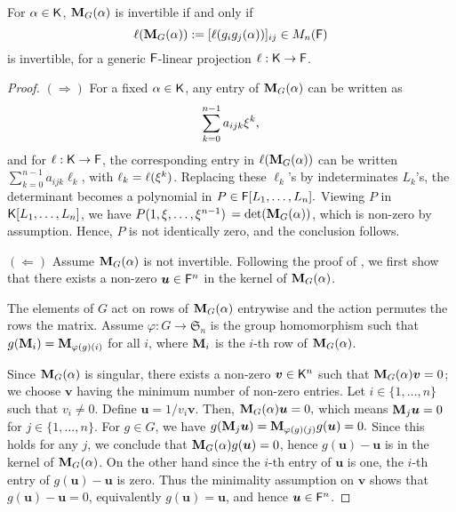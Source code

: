 \begin{lemma}
  \label{Lem:Proj}
  For $\alpha \in {\mathsf{K}}$, $\mat M_G(\alpha)$ is invertible if and only
  if $$\ell(\mat M_G(\alpha)) := [\ell(g_ig_j(\alpha))]_{ij} \in M_n(\F)$$
  is invertible, for a generic ${\mathsf{F}}$-linear projection $\ell: {\mathsf{K}} \to {\mathsf{F}}$.
\end{lemma}
\begin{proof}
  $(\Rightarrow)$ For a fixed $\alpha\in{\mathsf{K}}$, any entry of
  $\mat M_G(\alpha)$ can be written as
  \begin{equation}\label{Eq:PrimElm}
    \sum_{k= 0}^{n-1} a_{ijk}\xi^k,
  \end{equation}
  and for $\ell: {\mathsf{K}} \to {\mathsf{F}}$, the corresponding entry in $\ell(\mat
  M_G(\alpha))$ can be written $\sum_{k= 0}^{n-1} a_{ijk}\ell_k$, with
  $\ell_k = \ell(\xi^k)$. Replacing these $\ell_k$'s by
  indeterminates $L_k$'s, the determinant becomes a polynomial in $P
  \in {\mathsf{F}}[L_1, \ldots, L_n].$ Viewing $P$ in ${\mathsf{K}}[L_1, \ldots, L_n]$, we
  have $ P(1, \xi, \ldots, \xi^{n-1})$ $= \det(\mat M_G(\alpha))$,
  which is non-zero by assumption. Hence, $P$ is not identically zero,
  and the conclusion follows.
  
  $(\Leftarrow)$ Assume $\mat M_G(\alpha)$ is not invertible. Following the
  proof of \cite[Lemma 4]{Jam18}, we first show that there exists a
  non-zero $\boldsymbol{u} \in {\mathsf{F}}^n$ in the kernel of $\mat M_G(\alpha)$.
  
  The elements of $G$ act on rows of $\mat M_G(\alpha)$ entrywise and the
  action permutes the rows the matrix. Assume
  $\varphi : G \to \mathfrak{S}_n$ is the group homomorphism such that
  $g(\mat M_i) = \mat M_{\varphi(g)(i)}$ for all $i$, where $\mat M_i$ is
  the $i$-th row of $\mat M_G(\alpha)$.
  
  Since $\mat M_G(\alpha)$ is singular, there exists a non-zero
  $\boldsymbol{v} \in {\mathsf{K}}^n$ such that $\mat M_G(\alpha)\boldsymbol{v} = 0$;
  we choose $\boldsymbol{v}$ having the minimum number of non-zero
  entries. Let $i \in \lbrace 1, \ldots , n \rbrace$ such that
  $v_i \neq 0$. Define $\boldsymbol{u} = 1/v_i\boldsymbol{v}$. Then,
  $\mat M_G(\alpha)\boldsymbol{u} = 0,$ which means
  $\mat M_j \boldsymbol{u} = 0 $ for $j \in \lbrace 1, \ldots, n
  \rbrace$. For $g \in G$, we have
  $g(\mat M_j \boldsymbol{u}) = \mat M_{\varphi(g)(j)} g(\boldsymbol{u})=
  0.$ Since this holds for any $j$, we conclude that
  $\mat M_G(\alpha)g(\boldsymbol{u})= 0$, hence
  $g(\boldsymbol{u})-\boldsymbol{u}$ is in the kernel of
  $\mat M_G(\alpha)$. On the other hand since the $i$-th entry of
  $\boldsymbol{u}$ is one, the $i$-th entry of
  $g(\boldsymbol{u}) -\boldsymbol{u}$ is zero. Thus the minimality
  assumption on $\textbf{v}$ shows that
  $g(\boldsymbol{u}) -\boldsymbol{u} = 0$, equivalently
  $g(\boldsymbol{u})=\boldsymbol{u}$, and hence $\boldsymbol{u} \in {\mathsf{F}}^n$.
  

\end{proof}
